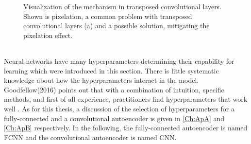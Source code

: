 \begin{figure}[htbp!]
	\begin{subfigure}{.435\textwidth}
		\centering
		
		\label{Fig: Upsampling(a)}
	\end{subfigure}\hfill
	\begin{subfigure}{.455\textwidth}
		\centering
		
		\label{Fig: Upsampling(b)}
	\end{subfigure}
	\caption{Visualization of the mechanism in transposed convolutional layers. Shown is pixelation, a common problem with transposed convolutional layers (a) and a possible solution, mitigating the pixelation effect.}
	\label{Fig: Upsampling}
\end{figure}\\
Neural networks have many hyperparameters determining their capability for learning which were introduced in this section. There is little systematic knowledge about how the hyperparameters interact in the model. Goodfellow(2016) points out that with a combination of intuition, specific methods, and first of all experience, practitioners find hyperparameters that work well \cite{Goodfellow}. As for this thesis, a discussion of the selection of hyperparameters for a fully-connected and  a convolutional autoencoder is given in \cref{Ch:ApA} and \cref{Ch:ApB} respectively. In the following, the fully-connected autoencoder is named FCNN and the convolutional autoencoder is named CNN.